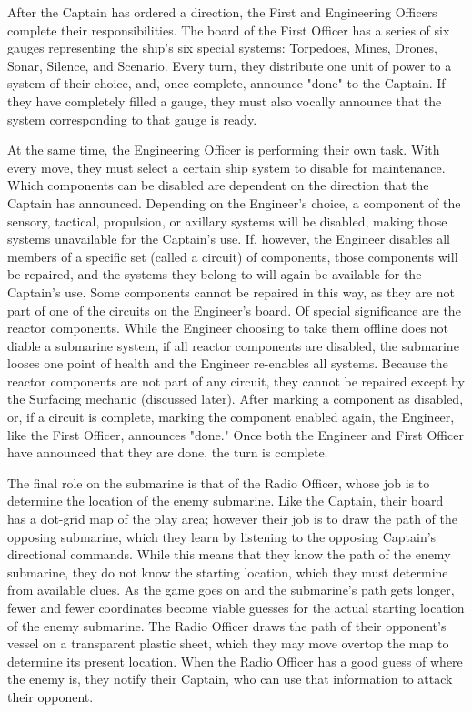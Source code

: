 
After the Captain has ordered a direction, the First and Engineering Officers complete their responsibilities. The board of the First Officer has a series of six gauges representing the ship's six special systems: Torpedoes, Mines, Drones, Sonar, Silence, and Scenario.  Every turn, they distribute one unit of power to a system of their choice, and, once complete, announce "done" to the Captain. If they have completely filled a gauge, they must also vocally announce that the system corresponding to that gauge is ready.


At the same time, the Engineering Officer is performing their own task. With every move, they must select a certain ship system to disable for maintenance. Which components can be disabled are dependent on the direction that the Captain has announced. Depending on the Engineer's choice, a component of the sensory, tactical, propulsion, or axillary systems will be disabled, making those systems unavailable for the Captain's use. If, however, the Engineer disables all members of a specific set (called a circuit) of components, those components will be repaired, and the systems they belong to will again be available for the Captain's use. Some components cannot be repaired in this way, as they are not part of one of the circuits on the Engineer's board. Of special significance are the reactor components. While the Engineer choosing to take them offline does not diable a submarine system, if all reactor components are disabled, the submarine looses one point of health and the Engineer re-enables all systems. Because the reactor components are not part of any circuit, they cannot be repaired except by the Surfacing mechanic (discussed later). After marking a component as disabled, or, if a circuit is complete, marking the component enabled again, the Engineer, like the First Officer, announces "done." Once both the Engineer and First Officer have announced that they are done, the turn is complete. 


The final role on the submarine is that of the Radio Officer, whose job is to determine the location of the enemy submarine. Like the Captain, their board has a dot-grid map of the play area; however their job is to draw the path of the opposing submarine, which they learn by listening to the opposing Captain's directional commands. While this means that they know the path of the enemy submarine, they do not know the starting location, which they must determine from available clues. As the game goes on and the submarine's path gets longer, fewer and fewer coordinates become viable guesses for the actual starting location of the enemy submarine. The Radio Officer draws the path of their opponent's vessel on a transparent plastic sheet, which they may move overtop the map to determine its present location. When the Radio Officer has a good guess of where the enemy is, they notify their Captain, who can use that information to attack their opponent.

